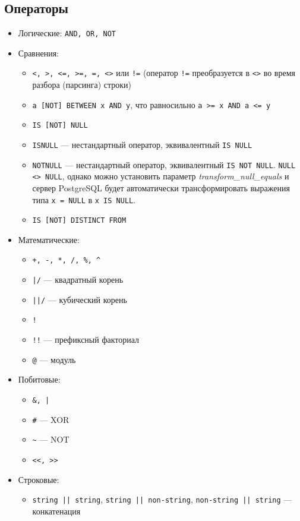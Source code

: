 \documentclass[a4paper,12pt,notitlepage,headsepline,pdftex]{scrartcl}
\begin{document}
  \subsection{Операторы}
    \begin{itemize}
      \item Логические:
        \verb'AND, OR, NOT'
      \item Сравнения:
        \begin{itemize}
          \item \verb'<, >, <=, >=, =, <>' или \verb'!=' (оператор
                      \verb'!=' преобразуется в \verb'<>' во время разбора
                                              (парсинга) строки)
          \item \verb'a [NOT] BETWEEN x AND y', что равносильно %
            \verb'a >= x AND a <= y'
          \item \verb'IS [NOT] NULL'
          \item \verb'ISNULL' --- нестандартный оператор, эквивалентный
            \verb'IS NULL'
          \item \verb'NOTNULL' --- нестандартный оператор, эквивалентный
            \verb'IS NOT NULL'.
            \verb'NULL <> NULL', однако можно установить параметр
            \emph{transform\_null\_equals} и сервер PostgreSQL будет
            автоматически трансформировать выражения типа \verb'x = NULL' в
            \verb'x IS NULL'.
          \item \verb'IS [NOT] DISTINCT FROM'
        \end{itemize}
      \item Математические:
        \begin{itemize}
          \item \verb'+, -, *, /, %, ^'
          \item \verb'|/' --- квадратный корень
          \item \verb'||/' --- кубический корень
          \item \verb'!'
          \item \verb'!!' --- префиксный факториал
          \item \verb'@' --- модуль
        \end{itemize}
      \item Побитовые:
        \begin{itemize}
          \item \verb'&, |'
          \item \verb'#' --- XOR
          \item \verb'~' --- NOT
          \item \verb'<<, >>'
        \end{itemize}
      \item Строковые:
        \begin{itemize}
          \item \verb'string || string', \verb'string || non-string',
            \verb'non-string || string' --- конкатенация
        \end{itemize}
    \end{itemize}
\end{document}
